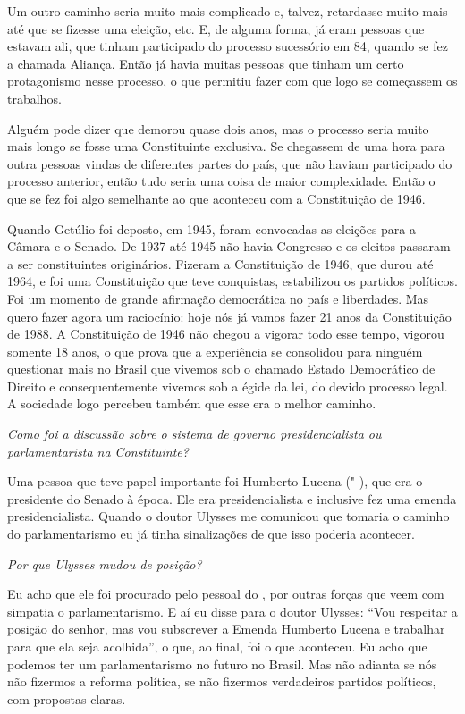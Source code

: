 Um outro caminho seria muito mais complicado e, talvez, retardasse muito
mais até que se fizesse uma eleição, etc. E, de alguma forma, já eram
pessoas que estavam ali, que tinham participado do processo sucessório
em 84, quando se fez a chamada Aliança. Então já havia muitas pessoas
que tinham um certo protagonismo nesse processo, o que permitiu fazer
com que logo se começassem os trabalhos.

Alguém pode dizer que demorou quase dois anos, mas o processo seria
muito mais longo se fosse uma Constituinte exclusiva. Se chegassem de
uma hora para outra pessoas vindas de diferentes partes do país, que não
haviam participado do processo anterior, então tudo seria uma coisa de
maior complexidade. Então o que se fez foi algo semelhante ao que
aconteceu com a Constituição de 1946.

Quando Getúlio foi deposto, em 1945, foram convocadas as eleições para a
Câmara e o Senado. De 1937 até 1945 não havia Congresso e os eleitos
passaram a ser constituintes originários. Fizeram a Constituição de
1946, que durou até 1964, e foi uma Constituição que teve conquistas,
estabilizou os partidos políticos. Foi um momento de grande afirmação
democrática no país e liberdades. Mas quero fazer agora um raciocínio:
hoje nós já vamos fazer 21 anos da Constituição de 1988. A Constituição
de 1946 não chegou a vigorar todo esse tempo, vigorou somente 18 anos, o
que prova que a experiência se consolidou para ninguém questionar mais
no Brasil que vivemos sob o chamado Estado Democrático de Direito e
consequentemente vivemos sob a égide da lei, do devido processo legal. A
sociedade logo percebeu também que esse era o melhor caminho.

\medskip

\noindent\emph{Como foi a discussão sobre o sistema de governo presidencialista
ou parlamentarista na Constituinte?}

Uma pessoa que teve papel importante foi Humberto
Lucena ("-), que era o presidente do Senado à época. Ele era
presidencialista e inclusive fez uma emenda presidencialista. Quando o
doutor Ulysses me comunicou que tomaria o caminho do parlamentarismo eu
já tinha sinalizações de que isso poderia acontecer.

\medskip

\noindent\emph{Por que Ulysses mudou de posição?}

Eu acho que ele foi procurado pelo pessoal do , por
outras forças que veem com simpatia o parlamentarismo. E aí eu disse
para o doutor Ulysses: ``Vou respeitar a posição do senhor, mas vou
subscrever a Emenda Humberto Lucena e trabalhar para que ela seja
acolhida'', o que, ao final, foi o que aconteceu. Eu acho que podemos
ter um parlamentarismo no futuro no Brasil. Mas não adianta se nós não
fizermos a reforma política, se não fizermos verdadeiros partidos
políticos, com propostas claras.

